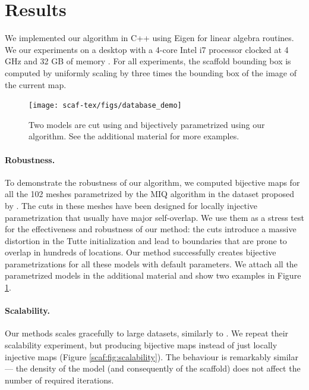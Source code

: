 \section{Results}
We implemented our algorithm in C++ using Eigen for linear algebra routines. We  our experiments on a desktop with a 4-core Intel i7  processor clocked at 4 GHz and 32 GB of memory . For all experiments, the scaffold bounding box is computed by uniformly scaling by three times the bounding box of the image of the current map. 

\begin{figure}[t]
\texttt{[image: scaf-tex/figs/database\_demo]}
\caption{Two models are cut using \cite{Bommes:2009} and bijectively parametrized using our algorithm. See the additional material for more examples.}
\label{scaf:fig:miq_database}
\vspace{-0.2cm}
\end{figure}

\paragraph{Robustness.} To demonstrate the robustness of our algorithm, we computed  bijective maps for all the 102 meshes parametrized by the MIQ algorithm \cite{Bommes:2009}  in the dataset proposed by \cite{Myles:2014}. The cuts in these meshes have been designed for locally injective parametrization that usually have major self-overlap. We use them as a stress test for the effectiveness and robustness of our method:  the cuts introduce a massive distortion in the Tutte initialization and lead to boundaries that are prone to overlap in hundreds of locations. Our method successfully creates bijective parametrizations for all these models with default parameters. We attach all the parametrized models in the additional material and show two examples in Figure \ref{scaf:fig:miq_database}. 


\paragraph{Scalability.} Our methods scales gracefully to large datasets, similarly to \cite{rabinovich2017scalable}. We repeat their scalability experiment, but producing bijective maps instead of just locally injective maps (Figure \ref{scaf:fig:scalability}). The behaviour is remarkably similar --- the density of the model (and consequently of the scaffold) does not affect the number of required iterations. 

